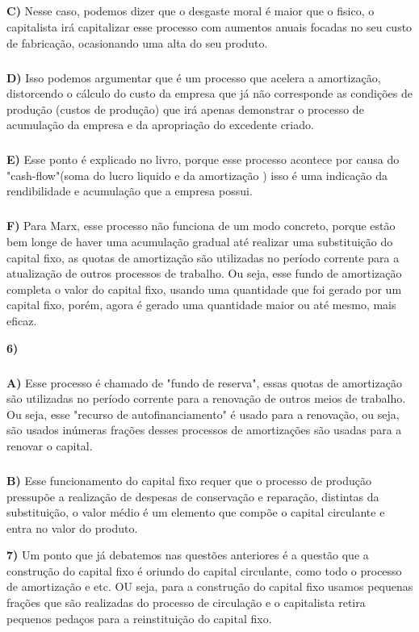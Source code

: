 \documentclass[a4paper, 12pt]{article} %
\begin{document}
\subparagraph{} \textbf{C)} Nesse caso, podemos dizer que o desgaste moral é maior que o fisico, o capitalista irá capitalizar esse processo com aumentos anuais focadas no seu custo de fabricação, ocasionando uma alta do seu produto. 

\subparagraph{} \textbf{D)} Isso podemos argumentar que é um processo que acelera a amortização, distorcendo o cálculo do custo da empresa que já não corresponde as condições de produção (custos de produção) que irá apenas demonstrar o processo de acumulação da empresa e da apropriação do excedente criado.

\subparagraph{} \textbf{E)} Esse ponto é explicado no livro, porque esse processo acontece por causa do "cash-flow"(soma do lucro liquido e da amortização ) isso é uma indicação da rendibilidade e acumulação que a empresa possui. 

\subparagraph{} \textbf{F)} Para Marx, esse processo não funciona de um modo concreto, porque estão bem longe de haver uma acumulação gradual até realizar uma substituição do capital fixo, as quotas de amortização são utilizadas no período corrente para a atualização de outros processos de trabalho. Ou seja, esse fundo de amortização completa o valor do capital fixo, usando uma quantidade que foi gerado por um capital fixo, porém, agora é gerado uma quantidade maior ou até mesmo, mais eficaz.

\vspace{0.5cm}

\par \textbf{6)} 

\subparagraph{} \textbf{A)} Esse processo é chamado de "fundo de reserva", essas quotas de amortização são utilizadas no período corrente para a renovação de outros meios de trabalho. Ou seja, esse "recurso de autofinanciamento" é usado para a renovação, ou seja, são usados inúmeras frações desses processos de amortizações são usadas para a renovar o capital.

\subparagraph{} \textbf{B)} Esse funcionamento do capital fixo requer que o processo de produção pressupõe a realização de despesas de conservação e reparação, distintas da substituição, o valor médio é um elemento que compõe o capital circulante e entra no valor do produto.

\vspace{0.5cm}

\par \textbf{7)} Um ponto que já debatemos nas questões anteriores é a questão que a construção do capital fixo é oriundo do capital circulante, como todo o processo de amortização e etc. OU seja, para a construção do capital fixo usamos pequenas frações que são realizadas do processo de circulação e o capitalista retira pequenos pedaços para a reinstituição do capital fixo.
\end{document}
